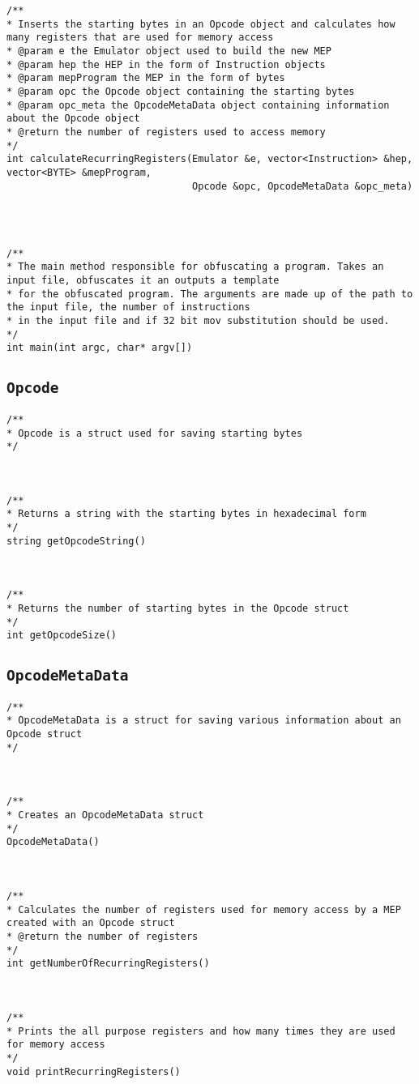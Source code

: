 \documentclass[11pt,twoside]{eitExjobb}
\begin{document}
\begin{Verbatim}[fontsize=\tiny]
/**
* Inserts the starting bytes in an Opcode object and calculates how many registers that are used for memory access
* @param e the Emulator object used to build the new MEP
* @param hep the HEP in the form of Instruction objects
* @param mepProgram the MEP in the form of bytes
* @param opc the Opcode object containing the starting bytes
* @param opc_meta the OpcodeMetaData object containing information about the Opcode object
* @return the number of registers used to access memory
*/
int calculateRecurringRegisters(Emulator &e, vector<Instruction> &hep, vector<BYTE> &mepProgram, 
                                Opcode &opc, OpcodeMetaData &opc_meta)




/**
* The main method responsible for obfuscating a program. Takes an input file, obfuscates it an outputs a template
* for the obfuscated program. The arguments are made up of the path to the input file, the number of instructions
* in the input file and if 32 bit mov substitution should be used.
*/
int main(int argc, char* argv[])
\end{Verbatim}

\subsection{\texttt{Opcode}}
\begin{Verbatim}[fontsize=\tiny]
/**
* Opcode is a struct used for saving starting bytes
*/



/**
* Returns a string with the starting bytes in hexadecimal form
*/	
string getOpcodeString()



/**
* Returns the number of starting bytes in the Opcode struct
*/
int getOpcodeSize()

\end{Verbatim}

\subsection{\texttt{OpcodeMetaData}}
\begin{Verbatim}[fontsize=\tiny]
/**
* OpcodeMetaData is a struct for saving various information about an Opcode struct
*/



/**
* Creates an OpcodeMetaData struct
*/
OpcodeMetaData()



/**
* Calculates the number of registers used for memory access by a MEP created with an Opcode struct
* @return the number of registers
*/
int getNumberOfRecurringRegisters()



/**
* Prints the all purpose registers and how many times they are used for memory access
*/
void printRecurringRegisters()

\end{Verbatim}
\end{document}
